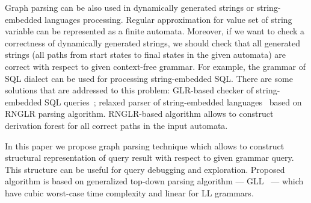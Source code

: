 \documentclass{sig-alternate} %
\begin{document}
Graph parsing can be also used in dynamically generated strings or string-embedded languages processing. 
Regular approximation for value set of string variable can be represented as a finite automata.
Moreover, if we want to check a correctness of dynamically generated strings, we should check that all generated strings (all paths from start states to final states in the given automata) are correct with respect to given context-free grammar. 
For example, the grammar of SQL dialect can be used for processing string-embedded SQL.
There are some solutions that are addressed to this problem: GLR-based checker of string-embedded SQL queries~\cite{Alvor1, Alvor2};
relaxed parser of string-embedded languages~\cite{relaxedRNGLR} based on RNGLR parsing algorithm.
RNGLR-based algorithm allows to construct derivation forest for all correct paths in the input automata.

In this paper we propose graph parsing technique which allows to construct structural representation of query result with respect to given grammar query.
This structure can be useful for query debugging and exploration. 
Proposed algorithm is based on generalized top-down parsing algorithm --- GLL~\cite{GLL} --- which have cubic worst-case time complexity and linear for LL grammars.  













\end{document}
